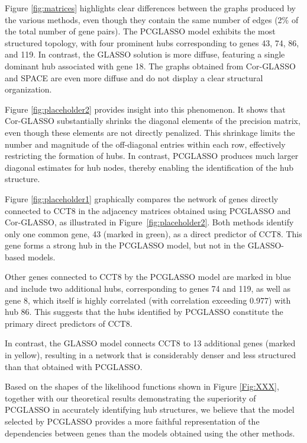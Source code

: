 \documentclass[12pt]{amsart}
\numberwithin{equation}{section}
\numberwithin{equation}{section}
\theoremstyle{plain}
\theoremstyle{definition}
\begin{document}
Figure \ref{fig:matrices} highlights clear differences between the graphs produced by the various methods, even though they contain the same number of edges (2\% of the total number of gene pairs). The PCGLASSO model exhibits the most structured topology, with four prominent hubs corresponding to genes 43, 74, 86, and 119. In contrast, the GLASSO solution is more diffuse, featuring a single dominant hub associated with gene 18. The graphs obtained from Cor-GLASSO and SPACE are even more diffuse and do not display a clear structural organization.

Figure \ref{fig:placeholder2} provides insight into this phenomenon. It shows that Cor-GLASSO substantially shrinks the diagonal elements of the precision matrix, even though these elements are not directly penalized. This shrinkage limits the number and magnitude of the off-diagonal entries within each row, effectively restricting the formation of hubs. In contrast, PCGLASSO produces much larger diagonal estimates for hub nodes, thereby enabling the identification of the hub structure.

Figure \ref{fig:placeholder1} graphically compares the network of genes directly connected to CCT8 in the adjacency matrices obtained using PCGLASSO and Cor-GLASSO, as illustrated in Figure~\ref{fig:placeholder2}. Both methods identify only one common gene, 43 (marked in green), as a direct predictor of CCT8. This gene forms a strong hub in the PCGLASSO model, but not in the GLASSO-based models. 

Other genes connected to CCT8 by the PCGLASSO model are marked in blue and include two additional hubs, corresponding to genes 74 and 119, as well as gene 8, which itself is highly correlated (with correlation exceeding 0.977) with hub 86. This suggests that the hubs identified by PCGLASSO constitute the primary direct predictors of CCT8.

In contrast, the GLASSO model connects CCT8 to 13 additional genes (marked in yellow), resulting in a network that is considerably denser and less structured than that obtained with PCGLASSO.

Based on the shapes of the likelihood functions shown in Figure \ref{Fig:XXX}, together with our theoretical results demonstrating the superiority of PCGLASSO in accurately identifying hub structures, we believe that the model selected by PCGLASSO provides a more faithful representation of the dependencies between genes than the models obtained using the other methods.
\end{document}
